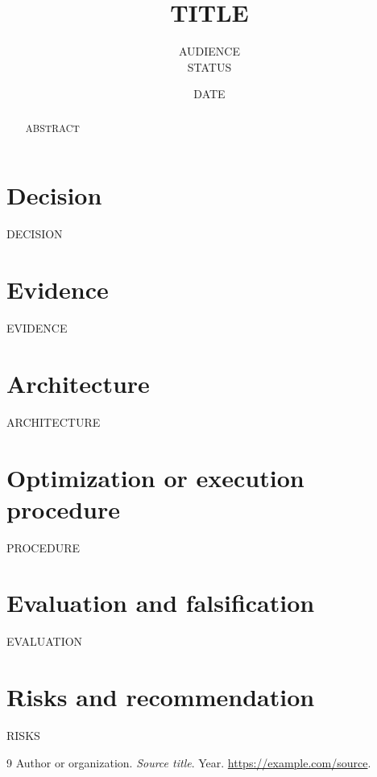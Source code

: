 \documentclass[10pt]{article}
\title{\vspace{-1.5em}\bfseries {{TITLE}}}
\author{{{AUDIENCE}}\\\small {{STATUS}}}
\date{{{DATE}}}
\begin{document}
\maketitle

\begin{abstract}
{{ABSTRACT}}
\end{abstract}

\section{Decision}
\label{sec:decision}
{{DECISION}}

\section{Evidence}
\label{sec:evidence}
{{EVIDENCE}}

\section{Architecture}
\label{sec:architecture}
{{ARCHITECTURE}}


\section{Optimization or execution procedure}
\label{sec:procedure}
{{PROCEDURE}}

\section{Evaluation and falsification}
\label{sec:evaluation}
{{EVALUATION}}

\section{Risks and recommendation}
\label{sec:risks}
{{RISKS}}

\begin{thebibliography}{9}
Author or organization. \emph{Source title}. Year. \url{https://example.com/source}.
\end{thebibliography}
\end{document}
